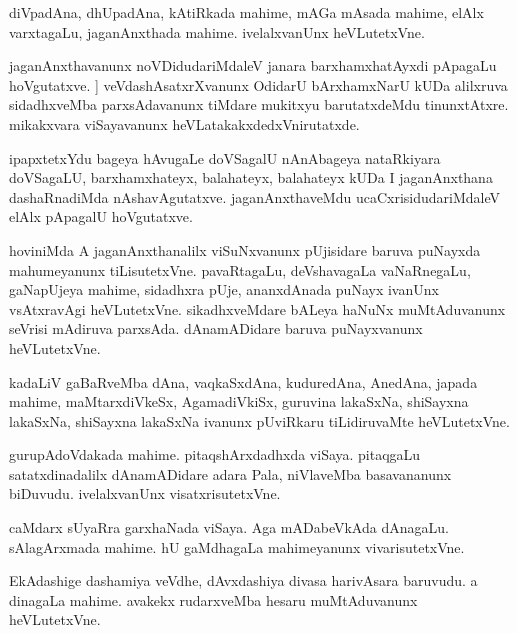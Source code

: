 \documentclass{article}
\begin{document}
\begin{mn}%
diVpadAna, dhUpadAna, kAtiRkada mahime, mAGa mAsada mahime, elAlx varxtagaLu, jaganAnxthada 
mahime. ivelalxvanUnx heVLutetxVne.
\end{mn}

\begin{mn}%
jaganAnxthavanunx noVDidudariMdaleV janara barxhamxhatAyxdi pApagaLu hoVgutatxve. ]
veVdashAsatxrXvanunx OdidarU bArxhamxNarU kUDa alilxruva sidadhxveMba parxsAdavanunx 
tiMdare mukitxyu barutatxdeMdu tinunxtAtxre. mikakxvara viSayavanunx 
heVLatakakxdedxVnirutatxde.
\end{mn}

\begin{mn}%
ipapxtetxYdu bageya hAvugaLe doVSagalU nAnAbageya nataRkiyara doVSagaLU, barxhamxhateyx, 
balahateyx, balahateyx kUDa I jaganAnxthana dashaRnadiMda nAshavAgutatxve. jaganAnxthaveMdu 
ucaCxrisidudariMdaleV elAlx pApagalU hoVgutatxve.
\end{mn}

\begin{mn}%
hoviniMda A jaganAnxthanalilx viSuNxvanunx pUjisidare baruva puNayxda mahumeyanunx 
tiLisutetxVne. pavaRtagaLu, deVshavagaLa vaNaRnegaLu, gaNapUjeya mahime, sidadhxra pUje, 
ananxdAnada puNayx ivanUnx vsAtxravAgi heVLutetxVne. sikadhxveMdare bALeya haNuNx 
muMtAduvanunx seVrisi mAdiruva parxsAda. dAnamADidare baruva puNayxvanunx heVLutetxVne.
\end{mn}

\begin{mn}%
kadaLiV gaBaRveMba dAna, vaqkaSxdAna, kuduredAna, AnedAna, japada mahime, maMtarxdiVkeSx, 
AgamadiVkiSx, guruvina lakaSxNa, shiSayxna lakaSxNa, shiSayxna lakaSxNa ivanunx pUviRkaru 
tiLidiruvaMte heVLutetxVne.
\end{mn}

\begin{mn}%
gurupAdoVdakada mahime. pitaqshArxdadhxda viSaya. pitaqgaLu satatxdinadalilx dAnamADidare 
adara Pala, niVlaveMba basavananunx biDuvudu. ivelalxvanUnx visatxrisutetxVne.
\end{mn}

\begin{mn}%
caMdarx sUyaRra garxhaNada viSaya. Aga mADabeVkAda dAnagaLu. sAlagArxmada mahime. hU 
gaMdhagaLa mahimeyanunx vivarisutetxVne.
\end{mn}

\begin{mn}%
EkAdashige dashamiya veVdhe, dAvxdashiya divasa harivAsara baruvudu. a dinagaLa mahime. 
avakekx rudarxveMba hesaru muMtAduvanunx heVLutetxVne.
\end{mn}
\end{document}
